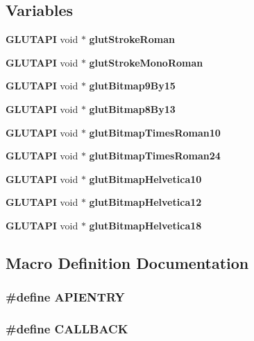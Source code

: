 \subsection*{Variables}
\begin{DoxyCompactItemize}
\item 
{\bf G\+L\+U\+T\+A\+PI} void $\ast$ {\bf glut\+Stroke\+Roman}
\item 
{\bf G\+L\+U\+T\+A\+PI} void $\ast$ {\bf glut\+Stroke\+Mono\+Roman}
\item 
{\bf G\+L\+U\+T\+A\+PI} void $\ast$ {\bf glut\+Bitmap9\+By15}
\item 
{\bf G\+L\+U\+T\+A\+PI} void $\ast$ {\bf glut\+Bitmap8\+By13}
\item 
{\bf G\+L\+U\+T\+A\+PI} void $\ast$ {\bf glut\+Bitmap\+Times\+Roman10}
\item 
{\bf G\+L\+U\+T\+A\+PI} void $\ast$ {\bf glut\+Bitmap\+Times\+Roman24}
\item 
{\bf G\+L\+U\+T\+A\+PI} void $\ast$ {\bf glut\+Bitmap\+Helvetica10}
\item 
{\bf G\+L\+U\+T\+A\+PI} void $\ast$ {\bf glut\+Bitmap\+Helvetica12}
\item 
{\bf G\+L\+U\+T\+A\+PI} void $\ast$ {\bf glut\+Bitmap\+Helvetica18}
\end{DoxyCompactItemize}


\subsection{Macro Definition Documentation}
\subsubsection[{A\+P\+I\+E\+N\+T\+RY}]{\setlength{\rightskip}{0pt plus 5cm}\#define A\+P\+I\+E\+N\+T\+RY}\label{glut_8h_a428a91acf2c2439dc1a257708ee1f805}
\subsubsection[{C\+A\+L\+L\+B\+A\+CK}]{\setlength{\rightskip}{0pt plus 5cm}\#define C\+A\+L\+L\+B\+A\+CK}\label{glut_8h_ad48a1ae177f90ad8a0ccc92481c664a7}
